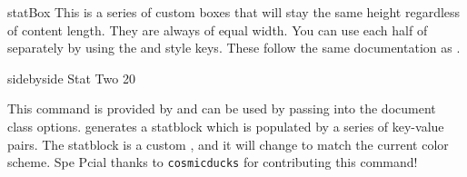\documentclass[article,ariandor]{plotweaver}
\begin{document}
\begin{docEnvironment}[doc updated=2026-08-11]{statBox}{}
This is a series of custom boxes that will stay the same height regardless of content length. They are always of equal width. You can use each half of  separately by using the  and  style keys. These follow the same documentation as .
\begin{dispExample*}{sidebyside}
%
{Stat Two}{
    20
}
\end{dispExample*}
\end{docEnvironment}

\newpage

\begin{docCommand}[
    doc name        = MakeStatBlock,
    doc new         = 2026-08-26,
    doc parameter   = \marg{key-value pairs},
  ]{}{}
  This command is provided by  and can be used by passing  into the document class options. generates a statblock which is populated by a series of key-value pairs. The statblock is a custom , and it will change to match the current color scheme. Spe Pcial thanks to \texttt{cosmicducks} for contributing this command!
\end{docCommand}
\end{document}
